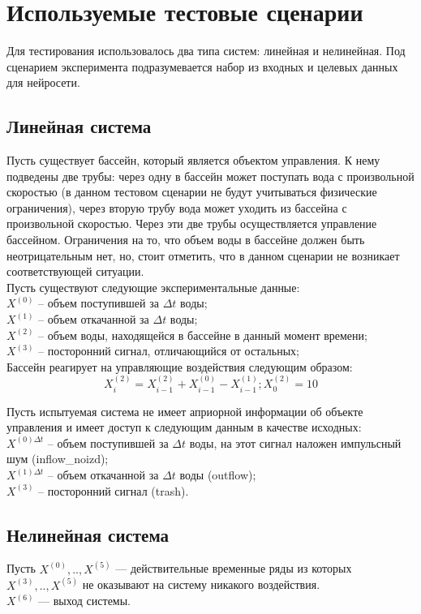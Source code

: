 \documentclass[utf8,usehyperref,14pt]{G7-32}
\begin{document}
\section{Используемые тестовые сценарии}
Для тестирования использовалось два типа систем: линейная и нелинейная. Под сценарием эксперимента подразумевается набор из входных и целевых данных для нейросети. \cite{Neural_Networks}
\subsection{Линейная система}
Пусть существует бассейн, который является объектом управления. К нему подведены две трубы: через одну в бассейн может поступать вода с произвольной скоростью (в данном тестовом сценарии не будут учитываться физические ограничения), через вторую трубу вода может уходить из бассейна с произвольной скоростью. Через эти две трубы осуществляется управление бассейном. Ограничения на то, что объем воды в бассейне должен быть неотрицательным нет, но, стоит отметить, что в данном сценарии не возникает соответствующей ситуации.\\
Пусть существуют следующие экспериментальные данные:\\
$ X^{(0)} $ – объем поступившей за $ \Delta t $ воды;\\
$ X^{(1)} $ – объем откачанной за $ \Delta t $ воды;\\
$ X^{(2)} $ – объем воды, находящейся в бассейне в данный момент времени;\\
$ X^{(3)} $ – посторонний сигнал, отличающийся от остальных;\\
Бассейн реагирует на управляющие воздействия следующим образом:\\
\begin{equation}
X^{(2)}_{i} = X^{(2)}_{i-1} + X^{(0)}_{i-1} - X^{(1)}_{i-1}; X^{(2)}_{0}=10
\end{equation}


Пусть испытуемая система не имеет априорной информации об объекте управления и имеет доступ к следующим данным в качестве исходных:\\
$ X^{(0) \Delta t} $ – объем поступившей за $ \Delta t $ воды, на этот сигнал наложен импульсный шум (inflow\_noizd);\\
$ X^{(1) \Delta t} $ – объем откачанной за $ \Delta t $ воды (outflow);\\
$ X^{(3)} $ – посторонний сигнал (trash).\\
\subsection{Нелинейная система}
Пусть $ X^{(0)}, .., X^{(5)}$ --- действительные временные ряды из которых $ X^{(3)}, .., X^{(5)}$ не оказывают на систему никакого воздействия.\\
$ X^{(6)} $ --- выход системы.
\end{document}
